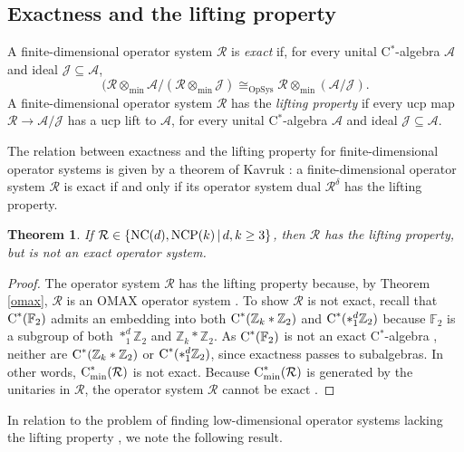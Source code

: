 \documentclass{amsart}
\newtheorem{theorem}{Theorem}[section]
\theoremstyle{definition}
\theoremstyle{remark}
\newcommand\ftwo{{\mathbb F}_2}
\newcommand\osr{{\mathcal R}}
\newcommand\omin{\otimes_{\textrm{min}}}
\newcommand{\A}{\mathcal{A}}                    %
\newcommand{\jay}{\mathcal{J}}                   %
\newcommand\cstar{{\textrm C}^*}                              %
\newcommand\cstare{{\textrm C}_{\textrm{min}}^*}              %
\numberwithin{equation}{section}
\begin{document}
 \subsection{Exactness and the lifting property}
 
 A finite-dimensional operator system $\osr$ is \emph{exact} if, for every unital C$^*$-algebra $\A$ and ideal $\jay\subseteq\A$,
 \[
( \osr\omin\A/( \osr\omin\jay) \cong_{\textrm{OpSys}} \osr\omin (\A / \jay).
 \]
 A finite-dimensional operator system $\osr$ has the \emph{lifting property} if every ucp map $\osr\rightarrow\A/\jay$
 has a ucp lift to $\A$, for every unital C$^*$-algebra $\A$ and ideal $\jay\subseteq\A$. 
 
The
relation between exactness and the lifting property for finite-dimensional operator systems
is given by a theorem of Kavruk \cite[Theorem 6.6]{kavruk2014}: a finite-dimensional operator system
$\osr$ is exact if and only if its operator system dual $\osr^\delta$ has the lifting property.

\begin{theorem}\label{lifting exactness} If $\osr\in\{\mbox{\textrm{NC}}(d), \mbox{\textrm{NCP}}(k)\,|\,d,k\geq 3\}$, 
then $\osr$ has the lifting property, but is not an exact operator
system.
\end{theorem}

\begin{proof} The operator system $\osr$ has the lifting property because, by Theorem \ref{omax},
$\osr$ is an OMAX operator system \cite[Lemma 9.10]{kavruk2014}. To show $\osr$ is not exact, recall that 
$\cstar(\ftwo)$ admits an embedding into both $\cstar(\mathbb Z_k\ast\mathbb Z_2)$  and $\cstar(\ast_1^d\mathbb Z_2)$
because 
$\ftwo$ is a subgroup of both $*_1^d \mathbb Z_2$ and $\mathbb Z_k * \mathbb Z_2$. As $\cstar(\mathbb F_2)$ 
is not an exact C$^*$-algebra \cite{wassermann1990}, neither are 
$\cstar(\mathbb Z_k\ast\mathbb Z_2)$ or $\cstar(\ast_1^d\mathbb Z_2)$, since exactness passes to subalgebras.  
In other words, $\cstare(\osr)$ is not exact. Because $\cstare(\osr)$ is generated by the unitaries in $\osr$,
the operator system $\osr$ cannot be exact \cite[Corollary 9.6]{kavruk--paulsen--todorov--tomforde2013}.
\end{proof}

In relation to the problem of finding low-dimensional operator systems lacking the lifting property \cite{harris2025,scherer2026}, 
we note the following
result.
\end{document}
